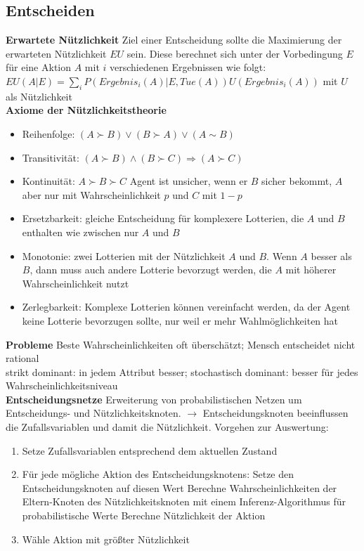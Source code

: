 \documentclass[12pt]{article}
\begin{document}
	\subsection{Entscheiden}
	\textbf{Erwartete Nützlichkeit} Ziel einer Entscheidung sollte die Maximierung der erwarteten Nützlichkeit $EU$ sein. Diese berechnet sich unter der Vorbedingung $E$ für eine Aktion $A$ mit $i$ verschiedenen Ergebnissen wie folgt: $EU(A|E) = \sum_i P(Ergebnis_i(A)|E, Tue(A)) U(Ergebnis_i(A))$ mit $U$ als Nützlichkeit\\
	\textbf{Axiome der Nützlichkeitstheorie}
	\begin{itemize}
		\item Reihenfolge: $(A \succ B) \vee (B \succ A) \vee (A \sim B)$
		\item Transitivität: $(A \succ B) \wedge (B \succ C) \Rightarrow (A \succ C)$
		\item Kontinuität: $A \succ B \succ C$ Agent ist unsicher, wenn er $B$ sicher bekommt, $A$ aber nur mit Wahrscheinlichkeit $p$ und $C$ mit $1-p$
		\item Ersetzbarkeit: gleiche Entscheidung für komplexere Lotterien, die $A$ und $B$ enthalten wie zwischen nur $A$ und $B$
		\item Monotonie: zwei Lotterien mit der Nützlichkeit $A$ und $B$. Wenn $A$ besser als $B$, dann muss auch andere Lotterie bevorzugt werden, die $A$ mit höherer Wahrscheinlichkeit nutzt
		\item Zerlegbarkeit: Komplexe Lotterien können vereinfacht werden, da der Agent keine Lotterie bevorzugen sollte, nur weil er mehr Wahlmöglichkeiten hat
	\end{itemize}
	\textbf{Probleme} Beste Wahrscheinlichkeiten oft überschätzt; Mensch entscheidet nicht rational\\
	strikt dominant: in jedem Attribut besser; stochastisch dominant: besser für jedes Wahrscheinlichkeitsniveau\\
	\textbf{Entscheidungsnetze} Erweiterung von probabilistischen Netzen um Entscheidungs- und Nützlichkeitsknoten. $\rightarrow$ Entscheidungsknoten beeinflussen die Zufallsvariablen und damit die Nützlichkeit. Vorgehen zur Auswertung:
	\begin{enumerate}
		\item Setze Zufallsvariablen entsprechend dem aktuellen Zustand
		\item Für jede mögliche Aktion des Entscheidungsknotens:
			\subitem Setze den Entscheidungsknoten auf diesen Wert
			\subitem Berechne Wahrscheinlichkeiten der Eltern-Knoten des Nützlichkeitsknoten mit einem Inferenz-Algorithmus für probabilistische Werte
			\subitem Berechne Nützlichkeit der Aktion
		\item Wähle Aktion mit größter Nützlichkeit
	\end{enumerate}
\end{document}
